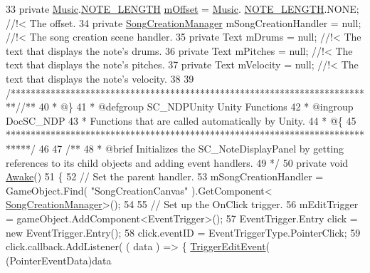 \begin{DoxyCodeInclude}
33 \textcolor{comment}{}    \textcolor{keyword}{private} \hyperlink{class_music}{Music}.\hyperlink{group___music_enums_gaf11b5f079adbb21c800b9eca1c5c3cbd}{NOTE\_LENGTH} \hyperlink{group___s_c___n_d_p_priv_var_ga0a78a2c25da29d944d56d1c8ebb74d03}{mOffset} = \hyperlink{class_music}{Music}.
      \hyperlink{group___music_enums_gaf11b5f079adbb21c800b9eca1c5c3cbd}{NOTE\_LENGTH}.NONE; \textcolor{comment}{//!< The offset.}
34 \textcolor{comment}{}    \textcolor{keyword}{private} \hyperlink{class_song_creation_manager}{SongCreationManager} mSongCreationHandler = null; \textcolor{comment}{//!< The song creation
       scene handler.}
35 \textcolor{comment}{}    \textcolor{keyword}{private} Text mDrums = null; \textcolor{comment}{//!< The text that displays the note's drums.}
36 \textcolor{comment}{}    \textcolor{keyword}{private} Text mPitches = null; \textcolor{comment}{//!< The text that displays the note's pitches.}
37 \textcolor{comment}{}    \textcolor{keyword}{private} Text mVelocity = null; \textcolor{comment}{//!< The text that displays the note's velocity.}
38 \textcolor{comment}{}
39     \textcolor{comment}{/*************************************************************************/}\textcolor{comment}{/** }
40 \textcolor{comment}{    * @\}}
41 \textcolor{comment}{    * @defgroup SC\_NDPUnity Unity Functions}
42 \textcolor{comment}{    * @ingroup DocSC\_NDP}
43 \textcolor{comment}{    * Functions that are called automatically by Unity.}
44 \textcolor{comment}{    * @\{}
45 \textcolor{comment}{    *****************************************************************************/}
46 \textcolor{comment}{}
47 \textcolor{comment}{    /**}
48 \textcolor{comment}{     * @brief Initializes the SC\_NoteDisplayPanel by getting references to its child objects and adding
       event handlers.}
49 \textcolor{comment}{    */}
50     \textcolor{keyword}{private} \textcolor{keywordtype}{void} \hyperlink{group___s_c___n_d_p_unity_ga131f594d4f9b5887acb0de0a8bb5532a}{Awake}()
51     \{
52         \textcolor{comment}{// Set the parent handler.}
53         mSongCreationHandler = GameObject.Find( \textcolor{stringliteral}{"SongCreationCanvas"} ).GetComponent<
      \hyperlink{class_song_creation_manager}{SongCreationManager}>();
54 
55         \textcolor{comment}{// Set up the OnClick trigger.}
56         mEditTrigger = gameObject.AddComponent<EventTrigger>();
57         EventTrigger.Entry click = \textcolor{keyword}{new} EventTrigger.Entry();
58         click.eventID = EventTriggerType.PointerClick;
59         click.callback.AddListener( ( data ) => \{ \hyperlink{group___s_c___n_d_p_handlers_ga7b25bcc6b76ae0894ac6eefde417caf1}{TriggerEditEvent}( (PointerEventData)data 

\end{DoxyCodeInclude}
